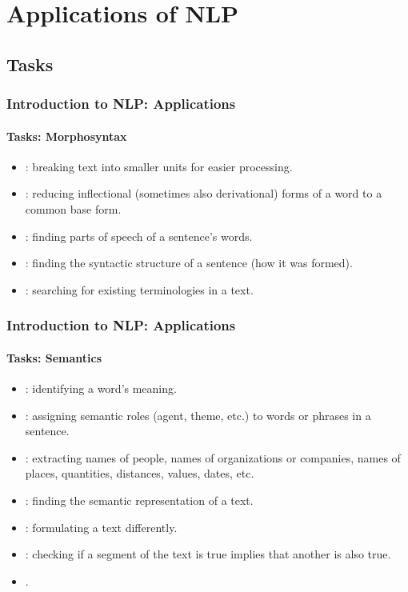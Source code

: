 \documentclass[xcolor=table]{beamer}
\begin{document}
\section{Applications of NLP}

%

\subsection{Tasks}

\begin{frame}
\frametitle{Introduction to NLP: Applications}
\framesubtitle{Tasks: Morphosyntax}

\begin{itemize}
	\item {}: breaking text into smaller units for easier processing.
	\item {}: reducing inflectional (sometimes also derivational) forms of a word to a common base form.
	\item {}: finding parts of speech of a sentence's words.
	\item {}: finding the syntactic structure of a sentence (how it was formed).
	\item {}: searching for existing terminologies in a text.
\end{itemize}

\end{frame}

\begin{frame}
\frametitle{Introduction to NLP: Applications}
\framesubtitle{Tasks: Semantics}

\begin{itemize}
	\item {}: identifying a word's meaning.
	\item {}: assigning semantic roles (agent, theme, etc.) to words or phrases in a sentence.
	\item {}: extracting names of people, names of organizations or companies, names of places, quantities, distances, values, dates, etc.
	\item {}: finding the semantic representation of a text.
	\item {}: formulating a text differently.
	\item {}: checking if a segment of the text is true implies that another is also true.
	\item {}.
\end{itemize}

\end{frame}
\end{document}
